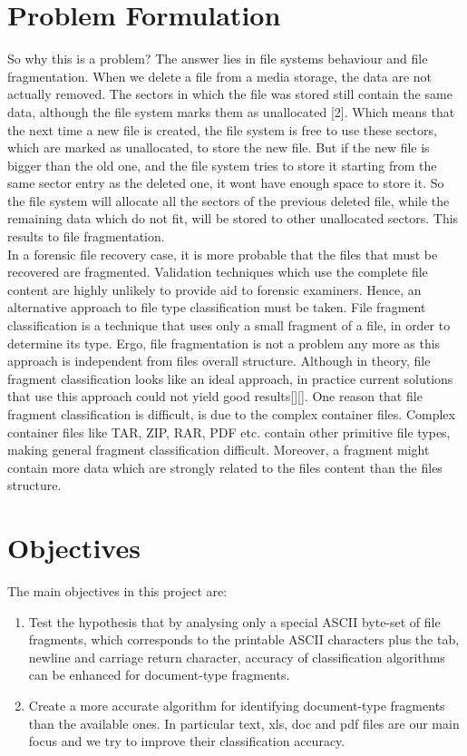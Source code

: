 \section{Problem Formulation}
So why this is a problem? The answer lies in file systems behaviour and
file fragmentation. When we delete a file from a media storage, the data are
not actually removed. The sectors in which the file was stored still contain
the same data, although the file system marks them as unallocated [2]. Which
means that the next time a new file is created, the file system is free to use
these sectors, which are marked as unallocated, to store the new file. But
if the new file is bigger than the old one, and the file system tries to store it
starting from the same sector entry as the deleted one, it wont have enough
space to store it. So the file system will allocate all the sectors of the previous deleted file, while the remaining data which do not fit, will be stored to
other unallocated sectors. This results to file fragmentation.\\

In a forensic file recovery case, it is more probable that the files that must be recovered are
fragmented. Validation techniques which use the complete file content
are highly unlikely to provide aid to forensic examiners. Hence, an alternative
approach to file type classification must be taken.
File fragment classification is a technique that uses only a small fragment
of a file, in order to determine its type. Ergo, file fragmentation is not a
problem any more as this approach is independent from files overall structure. Although in theory, file fragment classification looks like an ideal approach, in practice current solutions that use this approach could not yield
good results[][]. One reason that file fragment classification is difficult, is
due to the complex container files. Complex container files like TAR, ZIP,
RAR, PDF etc. contain other primitive file types, making general fragment
classification difficult. Moreover, a fragment might contain more data which
are strongly related to the files content than the files structure.

\section{Objectives}
The main objectives in this project are:
\begin{enumerate}
\item Test the hypothesis that by analysing only a special ASCII byte-set of file fragments, which corresponds to the printable ASCII characters plus the tab, newline and carriage return  character, accuracy of classification algorithms can be enhanced for document-type fragments.
\item Create a more accurate algorithm for identifying document-type fragments than the available ones. In particular text, xls, doc and pdf files are our main focus and we try to improve their classification accuracy.

\end{enumerate}

